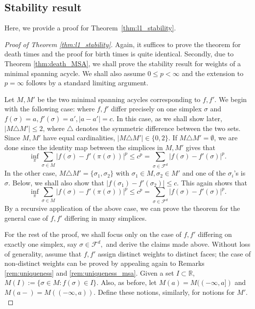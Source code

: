 \documentclass[12pt]{amsart}
\newcommand{\red}[1]{\textcolor{red}{#1}}
\newcommand{\gt}[1]{\textcolor{blue}{#1}}
\newcommand{\remove}[1]{}
\renewcommand{\red}[1]{#1}
\renewcommand{\gt}[1]{#1}
\numberwithin{equation}{section}
\numberwithin{theorem}{section}
\newcommand{\1}{\mathbf{1}}
\def\F{\mathcal{F}}
\def\K{\mathcal{K}}
\def\bR{\mathbb{R}}
\def\supp{\mathrm{supp}}
\begin{document}

\subsection{Stability result}
%
Here, we provide a proof for Theorem~\ref{thm:l1_stability}.
%
\begin{proof}[Proof of Theorem \ref{thm:l1_stability}]
\label{sec:stability}
Again, it suffices to prove the theorem for death times and the proof for birth times is quite identical. Secondly, due to Theorem \ref{thm:death_MSA}, we shall prove the stability result for weights of a minimal spanning acycle. We shall also assume $0 \leq p < \infty$ and the extension to $p = \infty$ follows by a standard limiting argument.

Let $M,M'$ be the two minimal spanning acycles corresponding to $f,f'$. We begin with the following case: where $f,f'$ differ precisely on one simplex $\sigma$ and $f(\sigma) = a, f'(\sigma)= a', |a-a'| = c$. In this case, \gt{as we shall show later}, $|M \triangle M'| \leq 2$, where $\triangle$ denotes the symmetric difference between the two sets. Since $M,M'$ have equal cardinalities, $|M \triangle M'| \in \{0,2\}.$ If $M \triangle M' = \emptyset$, we are done since the identity map between the simplices in $M,M'$ gives that
%
\[ \inf_{\pi} \sum_{\sigma \in M} |f(\sigma) - f'(\pi(\sigma))|^p \leq c^p = \sum_{\sigma \in \F^d}|f(\sigma)-f'(\sigma)|^p.\]
%
In the other case, $M \triangle M' = \{\sigma_1,\sigma_2\}$ with $\sigma_1 \in M,\sigma_2 \in M'$ and one of the $\sigma_i$'s is $\sigma$. \gt{Below}, we shall also show that $|f(\sigma_1) - f'(\sigma_2)| \leq c$. This again shows that
%
\[ \inf_{\pi} \sum_{\sigma \in M} |f(\sigma) - f'(\pi(\sigma))|^p \leq c^p = \sum_{\sigma \in \F^d}|f(\sigma)-f'(\sigma)|^p.\]
%
By a recursive application of the above case, we can prove the theorem for the general case of $f,f'$ differing in many simplices.

\gt{For the rest of the proof, we shall focus only on the case of $f,f'$ differing on exactly one simplex, say $\sigma \in \F^d,$ and derive the claims made above.} Without loss of generality, assume that $f,f'$ assign distinct weights to distinct faces; the case of non-distinct weights can be proved by appealing again to Remarks \ref{rem:uniqueness} and \ref{rem:uniqueness_msa}. \gt{Given a set $I \subset \bR$, $M(I) := \{\sigma \in M : f(\sigma) \in I\}.$ Also, as before, let $M(a) = M((-\infty,a])$ and $M(a-) = M((-\infty,a))$. \remove{Lastly, recall that $\K(a):= \{\sigma \in \K: f(\sigma) \leq a\}.$} Define these notions, similarly, for  notions for $M'.$ \remove{and $\K'.$}}


\end{proof}
\end{document}
